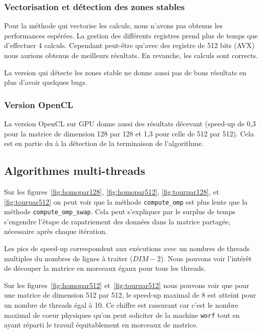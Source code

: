 \subsubsection{Vectorisation et détection des zones stables}

Pour la méthode qui vectorise les calculs, nous n'avons pas obtenus
les performances espérées. La gestion des différents registres prend
plus de temps que d'effectuer 4 calculs. Cependant peut-être qu'avec
des registre de 512 bits (AVX) nous aurions obtenus de meilleurs
résultats. En revanche, les calculs sont corrects.

La version qui détecte les zones stable ne donne aussi pas de bons
résultats en plus d'avoir quelques bugs.

\subsubsection{Version OpenCL}
\label{sec:res-opencl}

La version OpenCL sur GPU donne aussi des résultats décevant (speed-up
de 0,3 pour la matrice de dimension 128 par 128 et 1,3 pour celle de
512 par 512). Cela est en partie du à la détection de la terminaison
de l'algorithme.

\subsection{Algorithmes multi-threads}

Sur les figures~\ref{fig:homopar128}, \ref{fig:homopar512},
\ref{fig:tourpar128}, et \ref{fig:tourpar512} on peut voir que la
méthode \texttt{compute\_omp} est plus lente que la méthode
\texttt{compute\_omp\_swap}. Cela peut s'expliquer par le surplus de
temps s'engendre l'étape de rapatriement des données dans la matrice
partagée, nécessaire après chaque itération.
\medskip

Les pics de speed-up correspondent aux exécutions avec un nombres de
threads multiples du nombres de lignes à traiter ($DIM-2$). Nous
pouvons voir l'intérêt de découper la matrice en morceaux égaux pour
tous les threads.
\medskip

Sur les figures~\ref{fig:homopar512} et~\ref{fig:tourpar512} nous
pouvons voir que pour une matrice de dimension 512 par 512, le speed-up
maximal de 8 est atteint pour un nombre de threads égal à 10. Ce
chiffre est rassurant car c'est le nombre maximal de coeur physiques qu'on peut
soliciter de la machine \texttt{worf} tout en ayant réparti le travail
équitablement en morceaux de matrice.
\medskip

